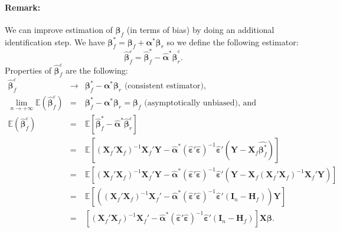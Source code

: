 \documentclass[12pt,a4paper]{report}
\begin{document}
\paragraph{Remark:}
		We can improve estimation of $\boldsymbol{\beta}_f$ (in terms of bias) by doing an additional identification step.	We have $\boldsymbol{\beta}^*_f=\boldsymbol{\beta}_f+\boldsymbol{\alpha}^*\boldsymbol{\beta}_r $ so we define the following estimator:
			\begin{equation}
			\hat{\boldsymbol{\beta}}_f^{\varepsilon}=\hat{\boldsymbol{\beta}}^*_f-\hat{\boldsymbol{\alpha}}^*\hat{\boldsymbol{\beta}}_{r}^{\varepsilon}. \nonumber 
			\end{equation}
Properties of $\hat{\boldsymbol{\beta}}_f^{\varepsilon}$ are the following:
	\begin{eqnarray}
	\hat{\boldsymbol{\beta}}_f^{\varepsilon}& \longrightarrow & \boldsymbol{\beta}^*_f-\boldsymbol{\alpha}^*\boldsymbol{\beta}_{r} \textrm{ (consistent estimator),}\nonumber\\
		\lim_{n \rightarrow +\infty}\mathbb{E}(\hat{\boldsymbol{\beta}}_f^{\varepsilon})&=&\boldsymbol{\beta}_f^*-\boldsymbol{\alpha}^*\boldsymbol{\beta}_r = \boldsymbol{\beta}_f \textrm{ (asymptotically unbiased), and} \nonumber \\
		\mathbb{E}(\hat{\boldsymbol{\beta}}_f^{\varepsilon})&=&\mathbb{E}[\hat{\boldsymbol{\beta}}^*_f-\hat{\boldsymbol{\alpha}}^*\hat{\boldsymbol{\beta}}_{r}^{\varepsilon}] \nonumber \\
		&=&\mathbb{E}[(\boldsymbol{X}_f'\boldsymbol{X}_f)^{-1}\boldsymbol{X}_f'\boldsymbol{Y}-\hat{\boldsymbol{\alpha}}^*(\hat{\boldsymbol{\varepsilon}}'\hat{\boldsymbol{\varepsilon}})^{-1}\hat{\boldsymbol{\varepsilon}}'(\boldsymbol{Y}- \boldsymbol{X}_f\hat{\boldsymbol{\beta}^*_f})]  \nonumber \\
		&=&\mathbb{E}[(\boldsymbol{X}_f'\boldsymbol{X}_f)^{-1}\boldsymbol{X}_f'\boldsymbol{Y}-\hat{\boldsymbol{\alpha}}^*(\hat{\boldsymbol{\varepsilon}}'\hat{\boldsymbol{\varepsilon}})^{-1}\hat{\boldsymbol{\varepsilon}}'(\boldsymbol{Y}- \boldsymbol{X}_f(\boldsymbol{X}_f'\boldsymbol{X}_f)^{-1}\boldsymbol{X}_f'\boldsymbol{Y})]  \nonumber \\
		&=&\mathbb{E}\left[\left((\boldsymbol{X}_f'\boldsymbol{X}_f)^{-1}\boldsymbol{X}_f'-\hat{\boldsymbol{\alpha}}^*(\hat{\boldsymbol{\varepsilon}}'\hat{\boldsymbol{\varepsilon}})^{-1}\hat{\boldsymbol{\varepsilon}}'(\boldsymbol{I}_n-\boldsymbol{H}_f)\right)\boldsymbol{Y}\right]  \nonumber \\
		&=&\left[(\boldsymbol{X}_f'\boldsymbol{X}_f)^{-1}\boldsymbol{X}_f'-\hat{\boldsymbol{\alpha}}^*(\hat{\boldsymbol{\varepsilon}}'\hat{\boldsymbol{\varepsilon}})^{-1}\hat{\boldsymbol{\varepsilon}}'(\boldsymbol{I}_n-\boldsymbol{H}_f)\right]\boldsymbol{X}\boldsymbol{\beta}. \nonumber
			\end{eqnarray}
\end{document}
